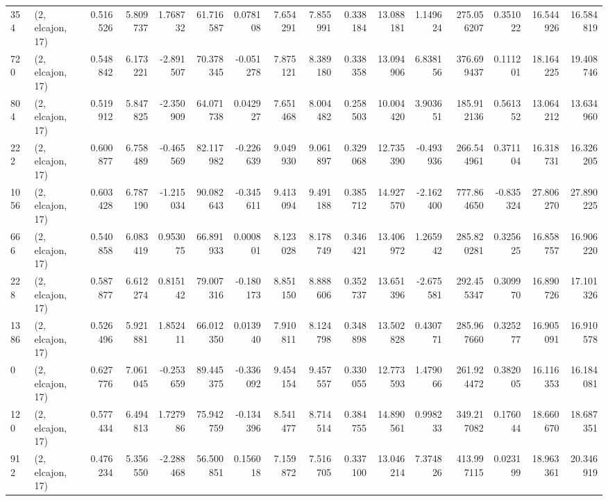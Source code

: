 \begin{tabular}{llrrrrrrrrrrrrrr}
354  &  (2, elcajon, 17) &   0.516526 &   5.809737 &   1.768732 &     61.716587 &    0.078108 &    7.654291 &    7.855991 &  0.338184 &  13.088181 &   1.149624 &   275.056207 &   0.351022 &  16.544926 &  16.584819 \\
720  &  (2, elcajon, 17) &   0.548842 &   6.173221 &  -2.891507 &     70.378345 &   -0.051278 &    7.875121 &    8.389180 &  0.338358 &  13.094906 &   6.838156 &   376.699437 &   0.111201 &  18.164225 &  19.408746 \\
804  &  (2, elcajon, 17) &   0.519912 &   5.847825 &  -2.350909 &     64.071738 &    0.042927 &    7.651468 &    8.004482 &  0.258503 &  10.004420 &   3.903651 &   185.912136 &   0.561352 &  13.064212 &  13.634960 \\
222  &  (2, elcajon, 17) &   0.600877 &   6.758489 &  -0.465569 &     82.117982 &   -0.226639 &    9.049930 &    9.061897 &  0.329068 &  12.735390 &  -0.493936 &   266.544961 &   0.371104 &  16.318731 &  16.326205 \\
1056 &  (2, elcajon, 17) &   0.603428 &   6.787190 &  -1.215034 &     90.082643 &   -0.345611 &    9.413094 &    9.491188 &  0.385712 &  14.927570 &  -2.162400 &   777.864650 &  -0.835324 &  27.806270 &  27.890225 \\
666  &  (2, elcajon, 17) &   0.540858 &   6.083419 &   0.953075 &     66.891933 &    0.000801 &    8.123028 &    8.178749 &  0.346421 &  13.406972 &   1.265942 &   285.820281 &   0.325625 &  16.858757 &  16.906220 \\
228  &  (2, elcajon, 17) &   0.587877 &   6.612274 &   0.815142 &     79.007316 &   -0.180173 &    8.851150 &    8.888606 &  0.352737 &  13.651396 &  -2.675581 &   292.455347 &   0.309970 &  16.890726 &  17.101326 \\
1386 &  (2, elcajon, 17) &   0.526496 &   5.921881 &   1.852411 &     66.012350 &    0.013940 &    7.910811 &    8.124798 &  0.348898 &  13.502828 &   0.430771 &   285.967660 &   0.325277 &  16.905091 &  16.910578 \\
0    &  (2, elcajon, 17) &   0.627776 &   7.061045 &  -0.253659 &     89.445375 &   -0.336092 &    9.454154 &    9.457557 &  0.330055 &  12.773593 &   1.479066 &   261.924472 &   0.382005 &  16.116353 &  16.184081 \\
120  &  (2, elcajon, 17) &   0.577434 &   6.494813 &   1.727986 &     75.942759 &   -0.134396 &    8.541477 &    8.714514 &  0.384755 &  14.890561 &   0.998233 &   349.217082 &   0.176044 &  18.660670 &  18.687351 \\
912  &  (2, elcajon, 17) &   0.476234 &   5.356550 &  -2.288468 &     56.500851 &    0.156018 &    7.159872 &    7.516705 &  0.337100 &  13.046214 &   7.374826 &   413.997115 &   0.023199 &  18.963361 &  20.346919 \\

\end{tabular}
